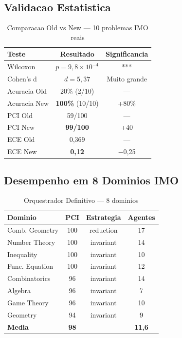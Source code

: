 \documentclass[5p]{elsarticle}
\begin{document}
\subsection{Validacao Estatistica}

\begin{table}[H]
\centering
\caption{Comparacao Old vs New --- 10 problemas IMO reais}
\label{tab:stats}
\small
\begin{tabular}{lcc}
\toprule
\textbf{Teste} & \textbf{Resultado} & \textbf{Significancia}\\
\midrule
Wilcoxon & $p=9,8\times10^{-4}$ & ***\\
Cohen's d & $d=5,37$ & Muito grande\\
Acuracia Old & 20\% (2/10) & ---\\
Acuracia New & \textbf{100\%} (10/10) & +80\%\\
PCI Old & 59/100 & ---\\
PCI New & \textbf{99/100} & +40\\
ECE Old & 0,369 & ---\\
ECE New & \textbf{0,12} & $-$0,25\\
\bottomrule
\end{tabular}
\end{table}

\subsection{Desempenho em 8 Dominios IMO}

\begin{table}[H]
\centering
\caption{Orquestrador Definitivo --- 8 dominios}
\label{tab:domains}
\small
\begin{tabular}{lccc}
\toprule
\textbf{Dominio} & \textbf{PCI} & \textbf{Estrategia} & \textbf{Agentes}\\
\midrule
Comb. Geometry & 100 & reduction & 17\\
Number Theory & 100 & invariant & 14\\
Inequality & 100 & invariant & 10\\
Func. Equation & 100 & invariant & 12\\
Combinatorics & 96 & invariant & 14\\
Algebra & 96 & invariant & 7\\
Game Theory & 96 & invariant & 10\\
Geometry & 94 & invariant & 9\\
\midrule
\textbf{Media} & \textbf{98} & --- & \textbf{11,6}\\
\bottomrule
\end{tabular}
\end{table}
\end{document}
